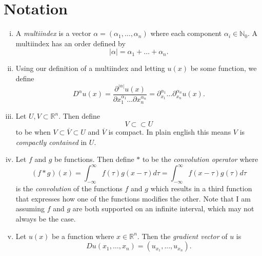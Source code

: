 \documentclass[11pt]{article}
\theoremstyle{definition}
\begin{document}
\newpage

\section{Notation}
\begin{enumerate}[(i)]
	\item A \textit{multiindex} is a vector $\alpha = (\alpha_1, \dots, \alpha_n)$ where each component $\alpha_i \in \mathbb{N}_0$.
A multiindex has an order defined by
\[|\alpha| = \alpha_1 + \dots + \alpha_n.\]

\item Using our definition of a multiindex and letting $u(x)$ be some function, we define
\[D^{\alpha}u(x) = \frac{\partial^{|\alpha|}u(x)}{\partial x_1^{\alpha_1} \dots \partial x_n^{\alpha_n}} = \partial_{x_1}^{\alpha_1}\dots\partial_{x_n}^{\alpha_n}u(x).\]

\item Let $U,V \subset \mathbb{R}^n$. Then define
\[V \subset\subset U\]
to be when $V \subset \overline{V} \subset U$ and $\overline{V}$ is compact. In plain english this means $V$ is \textit{compactly contained} in $U$.

\item Let $f$ and $g$ be functions. Then define $*$ to be the \textit{convolution operator} where
\[(f*g)(x) = \int_{-\infty}^{\infty}{f(\tau)g(x - \tau)d\tau} = \int_{-\infty}^{\infty}{f(x - \tau)g(\tau)d\tau}\]
is the \textit{convolution} of the functions $f$ and $g$ which results in a third function that expresses
how one of the functions modifies the other. Note that I am assuming $f$ and $g$ are both supported on an
infinite interval, which may not always be the case.

\item Let $u(x)$ be a function where $x \in \mathbb{R}^n$. Then the \textit{gradient vector} of $u$ is 
	\[Du(x_1,\dots,x_n) = (u_{x_1},...,u_{x_n}).\]
\end{enumerate}
\end{document}
